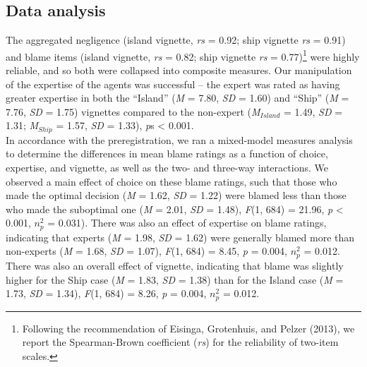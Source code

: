 \documentclass[
  man, donotrepeattitle,floatsintext]{apa6}
\begin{document}
\hypertarget{data-analysis}{%
\subsection{Data analysis}\label{data-analysis}}

The aggregated negligence (island vignette, \emph{rs} = 0.92; ship vignette \emph{rs} = 0.91) and blame items (island vignette, \emph{rs} = 0.82; ship vignette \emph{rs} = 0.77)\footnote{Following the recommendation of Eisinga, Grotenhuis, and Pelzer (2013), we report the Spearman-Brown coefficient (\emph{rs}) for the reliability of two-item scales.} were highly reliable, and so both were collapsed into composite measures. Our manipulation of the expertise of the agents was successful -- the expert was rated as having greater expertise in both the ``Island'' (\emph{M} = 7.80, \emph{SD} = 1.60) and ``Ship'' (\emph{M} = 7.76, \emph{SD} = 1.75) vignettes compared to the non-expert (\emph{M}\(_{Island}\) = 1.49, \emph{SD} = 1.31; \emph{M}\(_{Ship}\) = 1.57, \emph{SD} = 1.33), \emph{p}s \textless{} 0.001.\\
In accordance with the preregistration, we ran a mixed-model measures analysis to determine the differences in mean blame ratings as a function of choice, expertise, and vignette, as well as the two- and three-way interactions. We observed a main effect of choice on these blame ratings, such that those who made the optimal decision (\emph{M} = 1.62, \emph{SD} = 1.22) were blamed less than those who made the suboptimal one (\emph{M} = 2.01, \emph{SD} = 1.48), \emph{F}(1, 684) = 21.96, \emph{p} \textless{} 0.001, \(n^2_p\) = 0.031). There was also an effect of expertise on blame ratings, indicating that experts (\emph{M} = 1.98, \emph{SD} = 1.62) were generally blamed more than non-experts (\emph{M} = 1.68, \emph{SD} = 1.07), \emph{F}(1, 684) = 8.45, \emph{p} = 0.004, \(n^2_p\) = 0.012. There was also an overall effect of vignette, indicating that blame was slightly higher for the Ship case (\emph{M} = 1.83, \emph{SD} = 1.38) than for the Island case (\emph{M} = 1.73, \emph{SD} = 1.34), \emph{F}(1, 684) = 8.26, \emph{p} = 0.004, \(n^2_p\) = 0.012.\\
\end{document}
